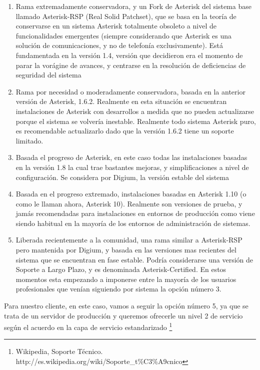 \begin{enumerate}

\item Rama extremadamente conservadora, y un Fork de Asterisk del sistema base llamado Asterisk-RSP (Real Solid Patchset), que se basa en la teoría de conservarse en un sistema Asterisk totalmente obsoleto a nivel de funcionalidades emergentes (siempre considerando que Asterisk es una solución de comunicaciones, y no de telefonía exclusivamente). Está fundamentada en la versión 1.4, versión que decidieron era el momento de parar la vorágine de avances, y centrarse en la resolución de deficiencias de seguridad del sistema
\item Rama por necesidad o moderadamente conservadora, basada en la anterior versión de Asterisk, 1.6.2. Realmente en esta situación se encuentran instalaciones de Asterisk con desarrollos a medida que no pueden actualizarse porque el sistema se volvería inestable. Realmente todo sistema Asterisk puro, es recomendable actualizarlo dado que la versión 1.6.2 tiene un soporte limitado.
\item Basada el progreso de Asterisk, en este caso todas las instalaciones basadas en la versión 1.8 la cual trae bastantes mejoras, y simplificaciones a nivel de configuración. Se considera por Digium, la versión estable del sistema
\item Basada en el progreso extremado, instalaciones basadas en Asterisk 1.10 (o como le llaman ahora, Asterisk 10). Realmente son versiones de prueba, y jamás recomendadas para instalaciones en entornos de producción como viene siendo habitual en la mayoría de los entornos de administración de sistemas.
\item Liberada recientemente a la comunidad, una rama similar a Asterisk-RSP pero mantenida por Digium, y basada en las versiones mas recientes del sistema que se encuentran en fase estable. Podría considerarse una versión de Soporte a Largo Plazo, y es denominada Asterisk-Certified. En estos momentos esta empezando a imponerse entre la mayoría de los usuarios profesionales que venían siguiendo por sistema la opción número 3.

\end{enumerate}

Para nuestro cliente, en este caso, vamos a seguir la opción número 5, ya que se trata de un servidor de producción y queremos ofrecerle un nivel 2 de servicio según el acuerdo en la capa de servicio estandarizado \footnote{Wikipedia, Soporte Técnico. http://es.wikipedia.org/wiki/Soporte\_t\%C3\%A9cnico} \cite{walker01}

